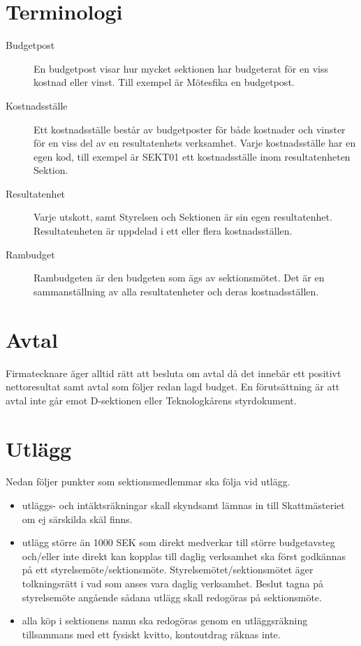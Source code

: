 \documentclass{dsekprotokoll}
\begin{document}

\section{Terminologi}
\begin{description}
\item[Budgetpost] En budgetpost visar hur mycket sektionen har budgeterat för en viss kostnad eller vinst. Till exempel är Mötesfika en budgetpost.
\item[Kostnadsställe] Ett kostnadsställe består av budgetposter för både kostnader och vinster för en viss del av en resultatenhets verksamhet. Varje kostnadsställe har en egen kod, till exempel är SEKT01 ett kostnadsställe inom resultatenheten Sektion.
\item[Resultatenhet] Varje utskott, samt Styrelsen och Sektionen är sin egen resultatenhet. Resultatenheten är uppdelad i ett eller flera kostnadsställen.
\item[Rambudget] Rambudgeten är den budgeten som ägs av sektionsmötet. Det är en sammanställning av alla resultatenheter och deras kostnadsställen. 
\end{description}

\section{Avtal}
Firmatecknare äger alltid rätt att besluta om avtal då det innebär ett
positivt nettoresultat samt avtal som följer redan lagd budget. En förutsättning är att avtal
inte går emot D-sektionen eller Teknologkårens styrdokument.

\section{Utlägg}
Nedan följer punkter som sektionsmedlemmar ska följa vid utlägg.

\begin{itemize}
    \item utläggs- och intäktsräkningar skall skyndsamt lämnas in till Skattmästeriet om ej särskilda skäl finns.

    \item utlägg större än 1000 SEK som direkt medverkar till större budgetavsteg och/eller inte direkt kan kopplas till daglig verksamhet ska först godkännas på ett styrelsemöte/sektionsmöte. Styrelsemötet/sektionsmötet äger tolkningsrätt i vad som anses vara daglig verksamhet. Beslut tagna på styrelsemöte angående sådana utlägg skall redogöras på sektionsmöte.

    \item alla köp i sektionens namn ska redogöras genom en utläggsräkning tillsammans med ett fysiskt kvitto, kontoutdrag räknas inte.
\end{itemize}
\end{document}
